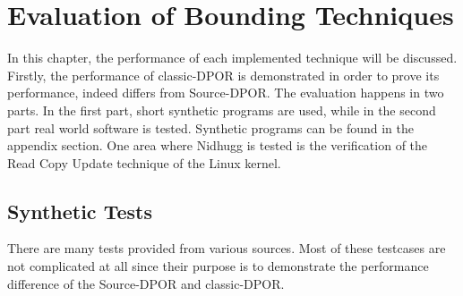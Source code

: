 \chapter{Evaluation of Bounding Techniques}
\label{Chapter 4}

In this chapter, the performance of each implemented technique will be discussed. Firstly, the performance of classic-DPOR is demonstrated in order to prove
its performance, indeed differs from Source-DPOR. The evaluation happens in two parts. In the first part, short synthetic programs are used, while in the second part
real world software is tested. Synthetic programs can be found in the appendix section. One area where Nidhugg is tested is the verification of the Read Copy Update
technique of the Linux kernel.


\section{Synthetic Tests}
There are many tests provided from various sources. Most of these testcases are not complicated at all since their purpose is to demonstrate the performance
difference of the Source-DPOR and classic-DPOR.

